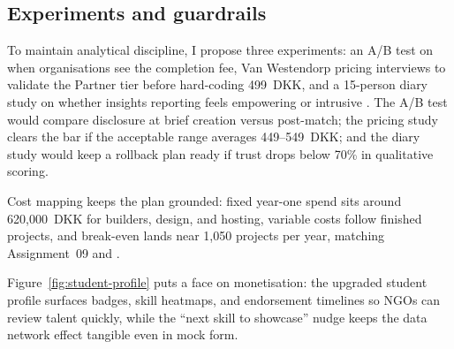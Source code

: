 \subsection*{Experiments and guardrails}
To maintain analytical discipline, I propose three experiments: an A/B test on when organisations see the completion fee, Van Westendorp pricing interviews to validate the Partner tier before hard-coding 499~DKK, and a 15-person diary study on whether insights reporting feels empowering or intrusive \citep{Reillier2017}. The A/B test would compare disclosure at brief creation versus post-match; the pricing study clears the bar if the acceptable range averages 449--549~DKK; and the diary study would keep a rollback plan ready if trust drops below 70\% in qualitative scoring.

Cost mapping keeps the plan grounded: fixed year-one spend sits around 620,000~DKK for builders, design, and hosting, variable costs follow finished projects, and break-even lands near 1,050 projects per year, matching Assignment~09 and \citet{ShapiroVarian1999}.

Figure~\ref{fig:student-profile} puts a face on monetisation: the upgraded student profile surfaces badges, skill heatmaps, and endorsement timelines so NGOs can review talent quickly, while the ``next skill to showcase'' nudge keeps the data network effect tangible even in mock form.

